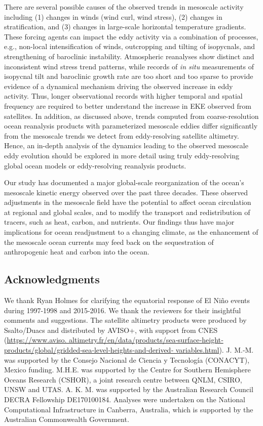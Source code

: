 \documentclass{nature}
\begin{document}
There are several possible causes of the observed trends in mesoscale activity including (1) changes in winds (wind curl, wind stress), (2) changes in stratification, and (3) changes in large-scale horizontal temperature gradients. These forcing agents can impact the eddy activity via a combination of processes, e.g., non-local intensification of winds, outcropping and tilting of isopycnals, and strengthening of baroclinic instability. Atmospheric reanalyses show distinct and inconsistent wind stress trend patterns, while records of \textit{in situ} measurements of isopycnal tilt and baroclinic growth rate are too short and too sparse to provide evidence of a dynamical mechanism driving the observed increase in eddy activity. Thus, longer observational records with higher temporal and spatial frequency are required to better understand the increase in EKE observed from satellites. In addition, as discussed above, trends computed from coarse-resolution ocean reanalysis products\cite{Hu_acceleration_2020} with parameterized mesoscale eddies differ significantly from the mesoscale trends we detect from eddy-resolving satellite altimetry. Hence, an in-depth analysis of the dynamics leading to the observed mesoscale eddy evolution should be explored in more detail using truly eddy-resolving global ocean models or eddy-resolving reanalysis products.

Our study has documented a major global-scale reorganization of the ocean's mesoscale kinetic energy observed over the past three decades. These observed adjustments in the mesoscale field have the potential to affect ocean circulation at regional and global scales, and to modify the transport and redistribution of tracers, such as heat, carbon, and nutrients. Our findings thus have major implications for ocean readjustment to a changing climate, as the enhancement of the mesoscale ocean currents may feed back on the sequestration of anthropogenic heat and carbon into the ocean. 




\subsection{Acknowledgments}\mbox{}\vspace{-1.5em}

We thank Ryan Holmes for clarifying the equatorial response of El Ni\~no events during 1997-1998 and 2015-2016.  We thank the reviewers for their insightful comments and suggestions. The satellite altimetry products were produced by Ssalto/Duacs and distributed by AVISO+, with support from CNES (\url{https://www.aviso. altimetry.fr/en/data/products/sea‐surface‐height‐products/global/gridded‐sea‐level‐heights‐and‐derived‐ variables.html}). J. M.‐M. was supported by the Consejo Nacional de Ciencia y Tecnología (CONACYT), Mexico funding. M.H.E. was supported by the Centre for Southern Hemisphere Oceans Research (CSHOR), a joint research centre between QNLM, CSIRO, UNSW and UTAS. A. K. M. was supported by the Australian Research Council DECRA Fellowship DE170100184. Analyses were undertaken on the National Computational Infrastructure in Canberra, Australia, which is supported by the Australian Commonwealth Government. 
\end{document}
